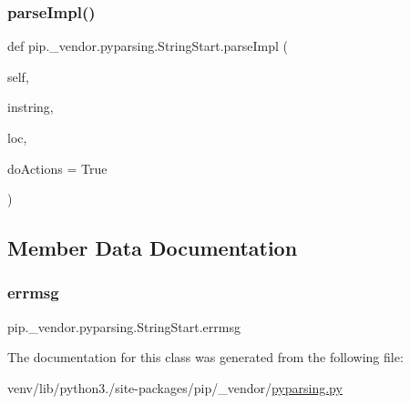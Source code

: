\subsubsection{\texorpdfstring{parse\+Impl()}{parseImpl()}}
{\footnotesize\ttfamily def pip.\+\_\+vendor.\+pyparsing.\+String\+Start.\+parse\+Impl (\begin{DoxyParamCaption}\item[{}]{self,  }\item[{}]{instring,  }\item[{}]{loc,  }\item[{}]{do\+Actions = {\ttfamily True} }\end{DoxyParamCaption})}



\subsection{Member Data Documentation}
\mbox{\label{classpip_1_1__vendor_1_1pyparsing_1_1StringStart_a9a740533ebefc6b770c4030d94ad92a8}} 
\subsubsection{\texorpdfstring{errmsg}{errmsg}}
{\footnotesize\ttfamily pip.\+\_\+vendor.\+pyparsing.\+String\+Start.\+errmsg}



The documentation for this class was generated from the following file\+:\begin{DoxyCompactItemize}
\item 
venv/lib/python3./site-\/packages/pip/\+\_\+vendor/\hyperlink{pip_2__vendor_2pyparsing_8py}{pyparsing.\+py}\end{DoxyCompactItemize}
